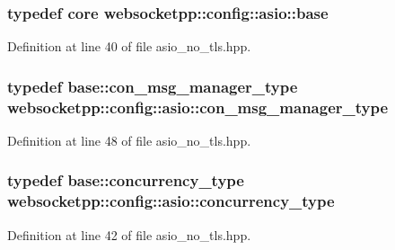 \hypertarget{structwebsocketpp_1_1config_1_1asio_a7f88d72d2fdfa55bd0c96e45709f8199}{}
\subsubsection[{base}]{\setlength{\rightskip}{0pt plus 5cm}typedef {\bf core} {\bf websocketpp\+::config\+::asio\+::base}}\label{structwebsocketpp_1_1config_1_1asio_a7f88d72d2fdfa55bd0c96e45709f8199}


Definition at line 40 of file asio\+\_\+no\+\_\+tls.\+hpp.

\hypertarget{structwebsocketpp_1_1config_1_1asio_a3473cd31498718e4cc11d5b34f71d4e6}{}
\subsubsection[{con\+\_\+msg\+\_\+manager\+\_\+type}]{\setlength{\rightskip}{0pt plus 5cm}typedef {\bf base\+::con\+\_\+msg\+\_\+manager\+\_\+type} {\bf websocketpp\+::config\+::asio\+::con\+\_\+msg\+\_\+manager\+\_\+type}}\label{structwebsocketpp_1_1config_1_1asio_a3473cd31498718e4cc11d5b34f71d4e6}


Definition at line 48 of file asio\+\_\+no\+\_\+tls.\+hpp.

\hypertarget{structwebsocketpp_1_1config_1_1asio_a4f2036249aa6a4a627ac42cc38cdaa06}{}
\subsubsection[{concurrency\+\_\+type}]{\setlength{\rightskip}{0pt plus 5cm}typedef {\bf base\+::concurrency\+\_\+type} {\bf websocketpp\+::config\+::asio\+::concurrency\+\_\+type}}\label{structwebsocketpp_1_1config_1_1asio_a4f2036249aa6a4a627ac42cc38cdaa06}


Definition at line 42 of file asio\+\_\+no\+\_\+tls.\+hpp.

